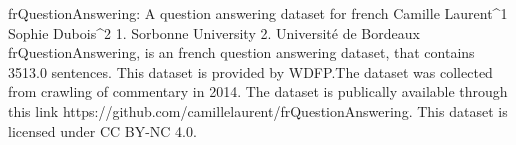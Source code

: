 
frQuestionAnswering: A question answering dataset for french
Camille Laurent^1 Sophie Dubois^2
1. Sorbonne University 2. Université de Bordeaux
frQuestionAnswering, is an french question answering dataset, that contains 3513.0 sentences.
This dataset is provided by WDFP.The dataset was collected from crawling of commentary in 2014. 
The dataset is publically available through this link https://github.com/camillelaurent/frQuestionAnswering. This dataset is licensed under CC BY-NC 4.0.

